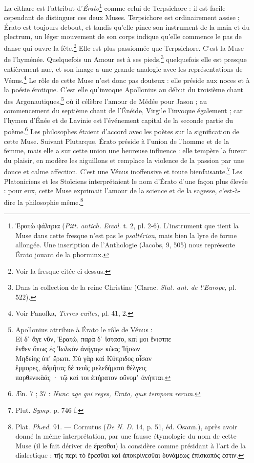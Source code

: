 \documentclass[a4paper, 11pt, oneside, polutonikogreek, french]{article}
\begin{document}
La cithare est l'attribut d'\emph{Érato}\footnote{Ἐρατὼ ψάλτρια (\emph{Pitt. antich. Ercol.} t. 2, pl. 2-6). L'instrument que tient la Muse dans cette fresque n'est pas le \emph{psaltérion}, mais bien la lyre de forme allongée. Une inscription de l'Anthologie (Jacobs, 9, 505) nous représente Érato jouant de la phorminx.} comme celui de Terpsichore : il est facile cependant de distinguer ces deux Muses. Terpsichore est ordinairement assise ; Érato est toujours debout, et tandis qu'elle pince son instrument de la main et du plectrum, un léger mouvement de son corps indique qu'elle commence le pas de danse qui ouvre la fête.\footnote{Voir la fresque citée ci-dessus.} Elle est plus passionnée que Terpsichore. C'est la Muse de l'hyménée. Quelquefois un Amour est à ses pieds,\footnote{Dans la collection de la reine Christine (Clarac. \emph{Stat. ant. de l'Europe}, pl. 522).} quelquefois elle est presque entièrement nue, et son image a une grande analogie avec les représentations de Vénus.\footnote{Voir Panofka, \emph{Terres cuites}, pl. 41, 2.} Le rôle de cette Muse n'est donc pas douteux : elle préside aux noces et à la poésie érotique. C'est elle qu'invoque Apollonius au début du troisième chant des Argonautiques,\footnote{Apollonius attribue à Érato le rôle de Vénus :\\\hspace*{5mm}Εἰ δ᾽ ἄγε νῦν, Ἐρατὼ, παρὰ δ᾽ ἴστασο, καί μοι ἔνιστπε\\\hspace*{5mm}ἔνθεν ὅπως ἐς Ἰωλκὸν ἀνήγαγε κῶας Ἰήσων\\\hspace*{5mm}Μηδείης ὑπ᾽ ἔρωτι. Σὺ γὰρ καὶ Κύπριδος αἶσαν\\\hspace*{5mm}ἔμμορες, ἀδμῆτας δὲ τεοῖς μελεδήμασι θέλγεις\\\hspace*{5mm}παρθενικὰάς · τῷ καί τοι ἐπήρατον οὔνομ᾽ ἀνήπται.} où il célèbre l'amour de Médée pour Jason ; au commencement du septième chant de l'Énéide, Virgile l'invoque également ; car l'hymen d'Énée et de Lavinie est l'événement capital de la seconde partie du poème.\footnote{Æn. 7 ; 37 : \emph{Nunc age qui reges, Erato, quæ tempora rerum.}} Les philosophes étaient d'accord avec les poètes sur la signification de cette Muse. Suivant Plutarque, Érato préside à l'union de l'homme et de la femme, mais elle a sur cette union une heureuse influence : elle tempère la fureur du plaisir, en modère les aiguillons et remplace la violence de la passion par une douce et calme affection. C'est une Vénus inoffensive et toute bienfaisante.\footnote{Plut. \emph{Symp.} p. 746 f.} Les Platoniciens et les Stoïciens interprétaient le nom d'Érato d'une façon plus élevée : pour eux, cette Muse exprimait l'amour de la science et de la sagesse, c'est-à-dire la philosophie même.\footnote{Plat. \emph{Phæd.} 91. --- Cornutus (\emph{De N. D.} 14, p. 51, éd. Osann.), après avoir donné la même interprétation, par une fausse étymologie du nom de cette Muse (il le fait dériver de ἔρεσθαι) la considère comme présidant à l'art de la dialectique : τῆς περὶ τὸ ἔρεσθαι καὶ ἀποκρίνεσθαι δυνάμεως ἐπίσκοπός ἐστιν.}
\end{document}
